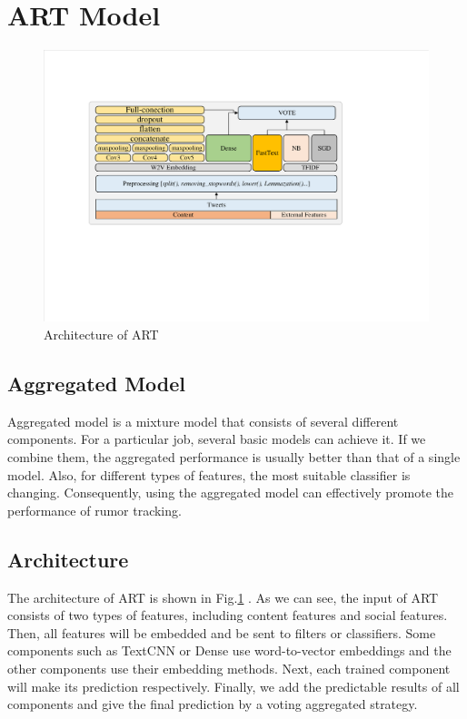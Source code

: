 \section{ART Model}
\label{sec:model}

\begin{figure}[htbp]
	\hspace{0ex}
	\vspace{0ex}
	\centering
	\includegraphics[width = \textwidth]{fig/structure}
	\caption{Architecture of ART}
	\label{fig:architecture}
\end{figure}

\subsection{Aggregated Model}
\label{sec:aggregated_model}
Aggregated model is a mixture model that consists of several different components. For a particular job, several basic models can achieve it. If we combine them, the aggregated performance is usually better than that of a single model. Also, for different types of features, the most suitable classifier is changing. Consequently, using the aggregated model can effectively promote the performance of rumor tracking. 

\subsection{Architecture}
\label{sec:architecture}
The architecture of ART is shown in Fig.\ref{fig:architecture} . As we can see, the input of  ART consists of two types of features, including content features and social features. Then, all features will be embedded and be sent to filters or classifiers.  Some components such as TextCNN or Dense use word-to-vector embeddings and the other components use their embedding methods. Next, each trained component will make its prediction respectively. Finally, we add the predictable results of all components and give the final prediction by a voting aggregated strategy.

